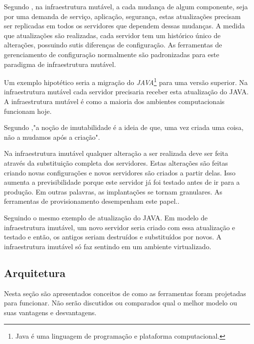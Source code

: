  Segundo , na infraestrutura mutável, a cada mudança de algum componente, seja por uma demanda de serviço, aplicação, segurança, estas atualizações precisam ser replicadas em todos os servidores que dependem dessas mudanças. A medida que atualizações são realizadas, cada servidor tem um histórico único de alterações, possuindo sutis diferenças de configuração. As ferramentas de gerenciamento de configuração normalmente são padronizadas para este paradigma de infraestrutura mutável. 
  
  Um exemplo hipotético seria a migração do \textit{JAVA}\footnote{Java é uma linguagem de programação e plataforma computacional.} para uma versão superior. Na infraestrutura mutável cada servidor precisaria receber esta atualização do JAVA. A infraestrutura mutável é como a maioria dos ambientes computacionais funcionam hoje.
 
 Segundo ,"a noção de imutabilidade é a ideia de que, uma vez criada uma coisa, não a mudamos após a criação".
 
 \hfill
 
 Na infraestrutura imutável qualquer alteração a ser realizada deve ser feita através da substituição completa dos servidores. Estas alterações são feitas criando novas configurações e novos servidores são criados a partir delas. Isso aumenta a previsibilidade porque este servidor já foi testado antes de ir para a produção. Em outras palavras, as implantações se tornam granulares. As ferramentas de provisionamento desempenham este papel.\cite{Morris:2016:ICM:3006361}.
 
  Seguindo o mesmo exemplo de atualização do JAVA. Em modelo de infraestrutura imutável, um novo servidor seria criado com essa atualização e testado e então, os antigos seriam destruídos e substituídos por novos. A infraestrutura imutável só faz sentindo em um ambiente virtualizado. 
 
\subsection{Arquitetura}

Nesta seção são apresentados conceitos de como as ferramentas foram projetadas para funcionar. Não serão discutidos ou comparados qual o melhor modelo ou suas vantagens e desvantagens. 

